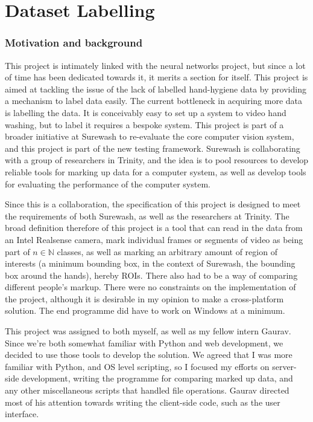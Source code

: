 \part{Dataset Labelling}
\section{Motivation and background}
This project is intimately linked with the neural networks project, but since a lot of time has been dedicated towards it, it merits a section for itself. This project is aimed at tackling the issue of the lack of labelled hand-hygiene data by providing a mechanism to label data easily. The current bottleneck in acquiring more data is labelling the data. It is conceivably easy to set up a system to video hand washing, but to label it requires a bespoke system. This project is part of a broader initiative at Surewash to re-evaluate the core computer vision system, and this project is part of the new testing framework. Surewash is collaborating with a group of researchers in Trinity, and the idea is to pool resources to develop reliable tools for marking up data for a computer system, as well as develop tools for evaluating the performance of the computer system.

Since this is a collaboration, the specification of this project is designed to meet the requirements of both Surewash, as well as the researchers at Trinity. The broad definition therefore of this project is a tool that can read in the data from an Intel Realsense camera, mark individual frames or segments of video as being part of $n \in \mathbb{N}$ classes, as well as marking an arbitrary amount of region of interests (a minimum bounding box, in the context of Surewash, the bounding box around the hands), hereby ROIs. There also had to be a way of comparing different people's markup. There were no constraints on the implementation of the project, although it is desirable in my opinion to make a cross-platform solution. The end programme did have to work on Windows at a minimum.

This project was assigned to both myself, as well as my fellow intern Gaurav. Since we're both somewhat familiar with Python and web development, we decided to use those tools to develop the solution. We agreed that I was more familiar with Python, and OS level scripting, so I focused my efforts on server-side development, writing the programme for comparing marked up data, and any other miscellaneous scripts that handled file operations. Gaurav directed most of his attention towards writing the client-side code, such as the user interface.

